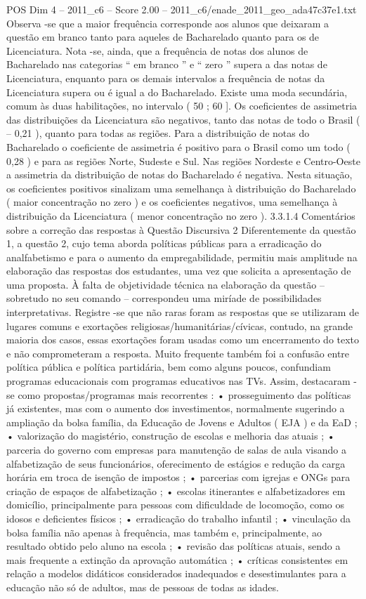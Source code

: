 \begin{textsample}{POS Dim 4 – 2011\_c6 – Score 2.00 – 2011\_c6/enade\_2011\_geo\_ada47c37e1.txt}
Observa -se que a maior frequência corresponde aos alunos que deixaram a questão em branco tanto para aqueles de Bacharelado quanto para os de Licenciatura.
Nota -se, ainda, que a frequência de notas dos alunos de Bacharelado nas categorias “ em branco ” e “ zero ” supera a das notas de Licenciatura, enquanto para os demais intervalos a frequência de notas da Licenciatura supera ou é igual a do Bacharelado.
Existe uma moda secundária, comum às duas habilitações, no intervalo ( 50 ; 60 ].
Os coeficientes de assimetria das distribuições da Licenciatura são negativos, tanto das notas de todo o Brasil ( – 0,21 ), quanto para todas as regiões.
Para a distribuição de notas do Bacharelado o coeficiente de assimetria é positivo para o Brasil como um todo ( 0,28 ) e para as regiões Norte, Sudeste e Sul.
Nas regiões Nordeste e Centro-Oeste a assimetria da distribuição de notas do Bacharelado é negativa.
Nesta situação, os coeficientes positivos sinalizam uma semelhança à distribuição do Bacharelado ( maior concentração no zero ) e os coeficientes negativos, uma semelhança à distribuição da Licenciatura ( menor concentração no zero ). 3.3.1.4 Comentários sobre a correção das respostas à Questão Discursiva 2 Diferentemente da questão 1, a questão 2, cujo tema aborda políticas públicas para a erradicação do analfabetismo e para o aumento da empregabilidade, permitiu mais amplitude na elaboração das respostas dos estudantes, uma vez que solicita a apresentação de uma proposta.
À falta de objetividade técnica na elaboração da questão – sobretudo no seu comando – correspondeu uma miríade de possibilidades interpretativas.
Registre -se que não raras foram as respostas que se utilizaram de lugares comuns e exortações religiosas/humanitárias/cívicas, contudo, na grande maioria dos casos, essas exortações foram usadas como um encerramento do texto e não comprometeram a resposta.
Muito frequente também foi a confusão entre política pública e política partidária, bem como alguns poucos, confundiam programas educacionais com programas educativos nas TVs.
Assim, destacaram -se como propostas/programas mais recorrentes : • prosseguimento das políticas já existentes, mas com o aumento dos investimentos, normalmente sugerindo a ampliação da bolsa família, da Educação de Jovens e Adultos ( EJA ) e da EaD ; • valorização do magistério, construção de escolas e melhoria das atuais ; • parceria do governo com empresas para manutenção de salas de aula visando a alfabetização de seus funcionários, oferecimento de estágios e redução da carga horária em troca de isenção de impostos ; • parcerias com igrejas e ONGs para criação de espaços de alfabetização ; • escolas itinerantes e alfabetizadores em domicílio, principalmente para pessoas com dificuldade de locomoção, como os idosos e deficientes físicos ; • erradicação do trabalho infantil ; • vinculação da bolsa família não apenas à frequência, mas também e, principalmente, ao resultado obtido pelo aluno na escola ; • revisão das políticas atuais, sendo a mais frequente a extinção da aprovação automática ; • críticas consistentes em relação a modelos didáticos considerados inadequados e desestimulantes para a educação não só de adultos, mas de pessoas de todas as idades.

\end{textsample}
